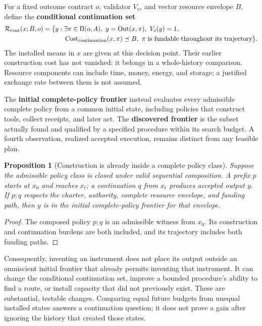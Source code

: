 \documentclass[10pt,a4paper]{article}
\newcommand{\Cost}{\operatorname{Cost}}
\newcommand{\Reach}{\mathcal{R}}
\newtheorem{proposition}{Proposition}
\begin{document}
For a fixed outcome contract $o$, validator $V_o$, and vector resource envelope $B$, define the \textbf{conditional continuation set}
\begin{equation}
\begin{split}
\Reach_{\rm cont}(x;B,o)=\{y:\;&\exists\pi\in\Pi(o,A),\
y=\operatorname{Out}(x,\pi),\ V_o(y)=1,\\
&\Cost_{\rm continuation}(x,\pi)\preceq B,\
\pi\text{ is fundable throughout its trajectory}\}.
\end{split}
\label{eq:reachable}
\end{equation}
The installed means in $x$ are given at this decision point. Their earlier construction cost has not vanished: it belongs in a whole-history comparison. Resource components can include time, money, energy, and storage; a justified exchange rate between them is not assumed.

The \textbf{initial complete-policy frontier} instead evaluates every admissible complete policy from a common initial state, including policies that construct tools, collect receipts, and later act. The \textbf{discovered frontier} is the subset actually found and qualified by a specified procedure within its search budget. A fourth observation, realized accepted execution, remains distinct from any feasible plan.

\begin{proposition}[Construction is already inside a complete policy class]\label{prop:composition}
Suppose the admissible policy class is closed under valid sequential composition. A prefix $p$ starts at $x_0$ and reaches $x_t$; a continuation $q$ from $x_t$ produces accepted output $y$. If $p;q$ respects the charter, authority, complete resource envelope, and funding path, then $y$ is in the initial complete-policy frontier for that envelope.
\end{proposition}
\begin{proof}
The composed policy $p;q$ is an admissible witness from $x_0$. Its construction and continuation burdens are both included, and its trajectory includes both funding paths.
\end{proof}

Consequently, inventing an instrument does not place its output outside an omniscient initial frontier that already permits inventing that instrument. It can change the conditional continuation set, improve a bounded procedure's ability to find a route, or install capacity that did not previously exist. These are substantial, testable changes. Comparing equal future budgets from unequal installed states answers a continuation question; it does not prove a gain after ignoring the history that created those states.
\end{document}
